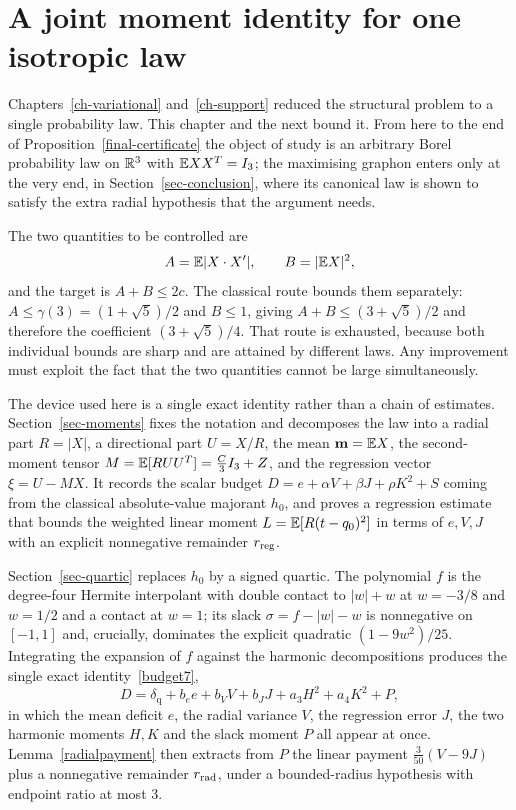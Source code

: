 \chapter{A joint moment identity for one isotropic law}\label{ch-moment}

Chapters~\ref{ch-variational} and~\ref{ch-support} reduced the structural
problem to a single probability law. This chapter and the next bound it. From
here to the end of Proposition~\ref{final-certificate} the object of study is
an arbitrary Borel probability law on $\mathbb R^3$ with $\mathbb E XX^T=I_3$; the
maximising graphon enters only at the very end, in
Section~\ref{sec-conclusion}, where its canonical law is shown to satisfy the
extra radial hypothesis that the argument needs.

The two quantities to be controlled are
\[
 A=\mathbb E|X\cdot X'|,\qquad B=|\mathbb E X|^2,
\]
and the target is $A+B\le2c$. The classical route bounds them separately:
$A\le\gamma(3)=(1+\sqrt5)/2$ and $B\le1$, giving $A+B\le(3+\sqrt5)/2$ and
therefore the coefficient $(3+\sqrt5)/4$. That route is exhausted, because
both individual bounds are sharp and are attained by different laws. Any
improvement must exploit the fact that the two quantities cannot be large
simultaneously.

The device used here is a single exact identity rather than a chain of
estimates. Section~\ref{sec-moments} fixes the notation and decomposes the
law into a radial part $R=|X|$, a directional part $U=X/R$, the mean
$\mathbf m=\mathbb E X$, the second-moment tensor $M=\mathbb E[RUU^T]=\tfrac C3I_3+Z$, and
the regression vector $\xi=U-MX$. It records the scalar budget
$D=e+\alpha V+\beta J+\rho K^2+S$ coming from the classical absolute-value
majorant $h_0$, and proves a regression estimate that bounds the weighted
linear moment $L=\mathbb E[R(t-q_0)^2]$ in terms of $e,V,J$ with an explicit
nonnegative remainder $r_{\rm reg}$.

Section~\ref{sec-quartic} replaces $h_0$ by a signed quartic. The polynomial
$f$ is the degree-four Hermite interpolant with double contact to $|w|+w$ at
$w=-3/8$ and $w=1/2$ and a contact at $w=1$; its slack $\sigma=f-|w|-w$ is
nonnegative on $[-1,1]$ and, crucially, dominates the explicit quadratic
$(1-9w^2)/25$. Integrating the expansion of $f$ against the harmonic
decompositions produces the single exact identity~\eqref{budget7},
\[
 D=\delta_{\mathrm q}+b_ee+b_VV+b_JJ+a_3H^2+a_4K^2+P,
\]
in which the mean deficit $e$, the radial variance $V$, the regression error
$J$, the two harmonic moments $H,K$ and the slack moment $P$ all appear at
once. Lemma~\ref{radialpayment} then extracts from $P$ the linear payment
$\tfrac3{50}(V-9J)$ plus a nonnegative remainder $r_{\rm rad}$, under a
bounded-radius hypothesis with endpoint ratio at most $3$.

